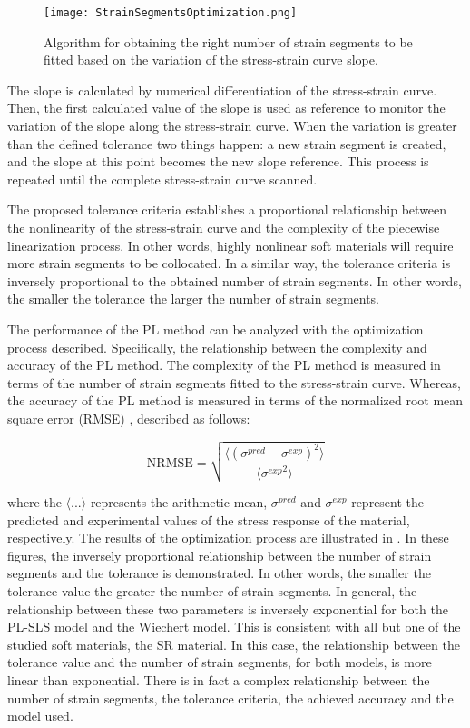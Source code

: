 \begin{figure}[H]
	\centering
	\texttt{[image: StrainSegmentsOptimization.png]}
	\caption{ Algorithm for obtaining the right number of strain segments to be fitted based on the variation of the stress-strain curve slope.}
	\label{fig:FCsegments}
\end{figure}

The slope is calculated by numerical differentiation of the stress-strain curve. Then, the first calculated value of the slope is used as reference to monitor the variation of the slope along the stress-strain curve. When the variation is greater than the defined tolerance two things happen: a new strain segment is created, and the slope at this point becomes the new slope reference. This process is repeated until the complete stress-strain curve scanned.

The proposed tolerance criteria establishes a proportional relationship between the nonlinearity of the stress-strain curve and the complexity of the piecewise linearization process. In other words, highly nonlinear soft materials will require more strain segments to be collocated. In a similar way, the tolerance criteria is inversely proportional to the obtained number of strain segments. In other words, the smaller the tolerance the larger the number of strain segments.

The performance of the PL method can be analyzed with the optimization process described. Specifically, the relationship between the complexity and accuracy of the PL method. The complexity of the PL method is measured in terms of the number of strain segments fitted to the stress-strain curve. Whereas, the accuracy of the PL method is measured in terms of the normalized root mean square error (RMSE) \cite{bergstrom2015mechanics}, described as follows:

\begin{equation}
    \mathrm{NRMSE} = \sqrt{  \frac{\langle (\sigma^{pred} - \sigma^{exp})^2 \rangle}{\langle {\sigma^{exp}}^2 \rangle} }
\label{eq2}
\end{equation}

\noindent where the  $\langle ... \rangle$ represents the arithmetic mean, $\sigma^{pred}$ and $\sigma^{exp}$ represent the predicted and experimental values of the stress response of the material, respectively. The results of the optimization process are illustrated in . In these figures, the inversely proportional relationship between the number of strain segments and the tolerance is demonstrated. In other words, the smaller the tolerance value the greater the number of strain segments. In general, the relationship between these two parameters is inversely exponential for both the PL-SLS model and the Wiechert model. This is consistent with all but one of the studied soft materials, the SR material. In this case, the relationship between the tolerance value and the number of strain segments, for both models, is more linear than exponential. There is in fact a complex relationship between the number of strain segments, the tolerance criteria, the achieved accuracy and the model used.

